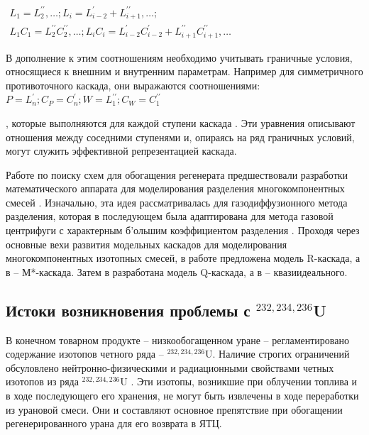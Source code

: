 $\begin{array}{c}
  {L_{1}=L_{2}^{\prime \prime}, \ldots ; L_{i}=L_{i-2}^{\prime}+L_{i+1}^{\prime \prime}, \ldots ;} \\
  {L_{1} C_{1}=L_{2}^{\prime \prime} C_{2}^{\prime \prime}, \ldots ; L_{i} C_{i}=L_{i-2}^{\prime} C_{i-2}^{\prime}+L_{i+1}^{\prime \prime} C_{i+1}^{\prime \prime}, \ldots}
\end{array}$

В дополнение к этим соотношениям необходимо учитывать граничные условия, относящиеся к внешним и внутренним параметрам. Например для симметричного противоточного каскада, они выражаются соотношениями: 
$P=L_{n}^{\prime} ; C_{P}=C_{n}^{\prime} ; W=L_{1}^{\prime \prime} ; C_{W}=C_{1}^{\prime \prime}$

, которые выполняются для каждой ступени каскада \cite{palkinDeterminationOptimalParameters2012}. Эти уравнения описывают отношения между соседними ступенями и, опираясь на ряд граничных условий, могут служить эффективной репрезентацией каскада. 


Работе по поиску схем для обогащения регенерата предшествовали разработки математического аппарата для моделирования разделения многокомпонентных смесей \cite{delagarzaMulticomponentIsotopeSeparation1961}.
Изначально, эта идея рассматривалась для газодиффузионного метода разделения, которая в последующем была адаптирована для метода газовой центрифуги с характерным б'ольшим коэффициентом разделения \cite{yamamotoMulticomponentIsotopeSeparating1978}.
Проходя через основные вехи развития модельных каскадов для моделирования многокомпонентных изотопных смесей, в работе \cite{delagarzaMulticomponentIsotopeSeparation1961} предложена модель R-каскада, а в \cite{levin1963} -- М*-каскада.
Затем в \cite{kolokoltsovDesignCascadesSeparating1970} разработана модель Q-каскада, а в \cite{sazykinKvaziidealnyeKaskadyDlya2000} -- квазиидеального.

\subsection{Истоки возникновения проблемы с $^{232,234,236}$U}

В конечном товарном продукте -- низкообогащенном уране -- регламентировано содержание изотопов четного ряда -- $^{232,234,236}$U.
Наличие строгих ограничений обсуловлено нейтронно-физическими и радиационными свойствами четных изотопов из ряда $^{232,234,236}$U \cite{smirnovEvolutionIsotopicComposition2012, proselkovAnalizVozmozhnostiIspolzovaniya2003, dudnikovInfluence236UEfficacy2016}.
Эти изотопы, возникшие при облучении топлива и в ходе последующего его хранения, не могут быть извлечены в ходе переработки из урановой смеси. Они и составляют основное препятствие при обогащении регенерированного урана для его возврата в ЯТЦ.


